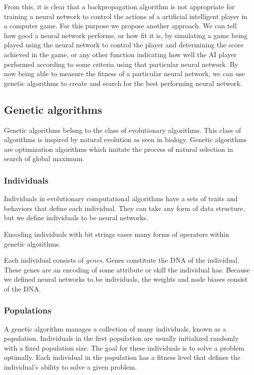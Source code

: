 From this, it is clear that a backpropagation algorithm is not appropriate for training a neural network to control the actions of a artificial intelligent player in a computer game. For this purpose we propose another approach. We can tell how good a neural network performs, or how fit it is, by simulating a game being played using the neural network to control the player and determining the score achieved in the game, or any other function indicating how well the AI player performed according to some criteria using that particular neural network. By now being able to measure the fitness of a particular neural network, we can use genetic algorithms to create and search for the best performing neural network.

\subsection{Genetic algorithms}
Genetic algorithms belong to the class of evolutionary algorithms. This class of algorithms is inspired by natural evolution as seen in biology. Genetic algorithms are optimization algorithms which imitate the process of natural selection in search of global maximum.

\subsubsection{Individuals}
Individuals in evolutionary computational algorithms have a sets of traits and behaviors that define each individual. They can take any form of data structure, but we define individuals to be neural networks.

Encoding individuals with bit strings eases many forms of operators within genetic algorithms.

Each individual consists of \emph{genes}. Genes constitute the DNA of the individual. These genes are an encoding of some attribute or skill the individual has. Because we defined neural networks to be individuals, the weights and node biases consist of the DNA.

\subsubsection{Populations}
A genetic algorithm manages a collection of many individuals, known as a population. Individuals in the first population are usually initialized randomly with a fixed population size. The goal for these individuals is to solve a problem optimally. Each individual in the population has a fitness level that defines the individual's ability to solve a given problem.


